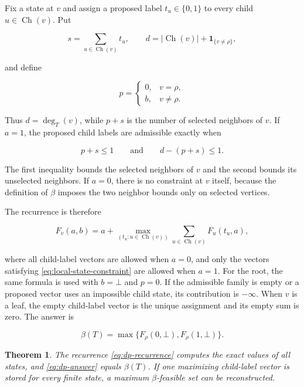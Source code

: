 \documentclass[preprint,12pt]{elsarticle}
\newtheorem{theorem}{Theorem}[section]
\numberwithin{equation}{section}
\begin{document}
Fix a state at \(v\) and assign a proposed label \(t_u\in\{0,1\}\) to
every child \(u\in\operatorname{Ch}(v)\). Put

\[
s=\sum_{u\in\operatorname{Ch}(v)}t_u,
\qquad
d=|\operatorname{Ch}(v)|+\mathbf 1_{\{v\ne\rho\}},
\]

and define

\[
p=
\begin{cases}
0,&v=\rho,\\
b,&v\ne\rho.
\end{cases}
\]

Thus \(d=\deg_T(v)\), while \(p+s\) is the number of selected neighbors
of \(v\). If \(a=1\), the proposed child labels are admissible exactly
when

\nopagebreak[4]
\begin{equation}\label{eq:local-state-constraint}
p+s\le 1
\qquad\text{and}\qquad
d-(p+s)\le 1.
\end{equation}

The first inequality bounds the selected neighbors of \(v\) and the
second bounds its unselected neighbors. If \(a=0\), there is no
constraint at \(v\) itself, because the definition of \(\beta\) imposes
the two neighbor bounds only on selected vertices.

The recurrence is therefore

\begin{equation}\label{eq:dp-recurrence}
F_v(a,b)
=a+
\max_{(t_u:u\in\operatorname{Ch}(v))}
\sum_{u\in\operatorname{Ch}(v)}F_u(t_u,a),
\end{equation}

where all child-label vectors are allowed when \(a=0\), and only the
vectors satisfying \eqref{eq:local-state-constraint} are allowed when \(a=1\). For the root, the
same formula is used with \(b=\bot\) and \(p=0\). If the admissible
family is empty or a proposed vector uses an impossible child state, its
contribution is \(-\infty\). When \(v\) is a leaf, the empty child-label
vector is the unique assignment and its empty sum is zero. The answer is

\begin{equation}\label{eq:dp-answer}
\beta(T)=\max\{F_\rho(0,\bot),F_\rho(1,\bot)\}.
\end{equation}

\begin{theorem}\label{thm:dp-correctness}
The recurrence \eqref{eq:dp-recurrence} computes the exact values of
all states, and \eqref{eq:dp-answer} equals \(\beta(T)\). If one maximizing child-label
vector is stored for every finite state, a maximum \(\beta\)-feasible
set can be reconstructed.
\end{theorem}
\end{document}
